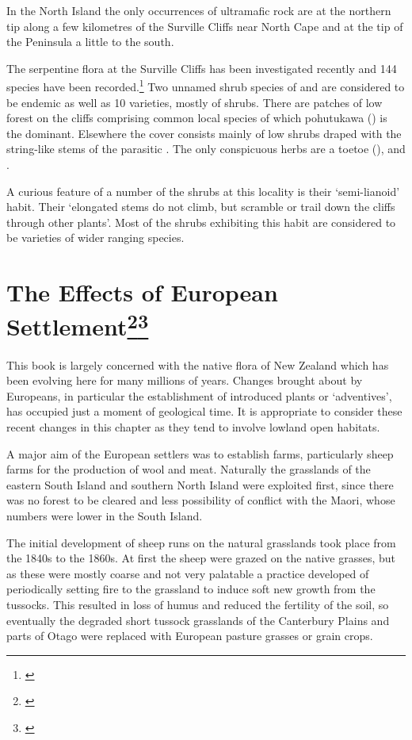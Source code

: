 In the North Island the only occurrences of ultramafic rock are at the northern tip along a few kilometres of the Surville Cliffs near North Cape and at the tip of the Peninsula a little to the south.

The serpentine flora at the Surville Cliffs has been investigated recently and 144 species have been recorded.\footnote{\cite{druce1979indigenous}}
Two unnamed shrub species of  and  are considered to be endemic as well as 10 varieties, mostly of shrubs.
There are patches of low forest on the cliffs comprising common local species of which pohutukawa () is the dominant.
Elsewhere the cover consists mainly of low shrubs draped with the string-like stems of the parasitic .
The only conspicuous herbs are a toetoe (),  and .

A curious feature of a number of the shrubs at this locality is their `semi-lianoid' habit.
Their `elongated stems do not climb, but scramble or trail down the cliffs through other plants'.
Most of the shrubs exhibiting this habit are considered to be varieties of wider ranging species.

\section[The Effects of European Settlement]{The Effects of European Settlement\footnote{\cite{healy1980flora}}\footnote{\cite{healy1969adventive}}}

This book is largely concerned with the native flora of New Zealand which has been evolving here for many millions of years.
Changes brought about by Europeans, in particular the establishment of introduced plants or `adventives', has occupied just a moment of geological time.
It is appropriate to consider these recent changes in this chapter as they tend to involve lowland open habitats.

A major aim of the European settlers was to establish farms, particularly sheep farms for the production of wool and meat.
Naturally the grasslands of the eastern South Island and southern North Island were exploited first, since there was no forest to be cleared and less possibility of conflict with the Maori, whose numbers were lower in the South Island.

The initial development of sheep runs on the natural grasslands took place from the 1840s to the 1860s.
At first the sheep were grazed on the native grasses, but as these were mostly coarse and not very palatable a practice developed of periodically setting fire to the grassland to induce soft new growth from the tussocks.
This resulted in loss of humus and reduced the fertility of the soil, so eventually the degraded short tussock grasslands of the Canterbury Plains and parts of Otago were replaced with European pasture grasses or grain crops.

